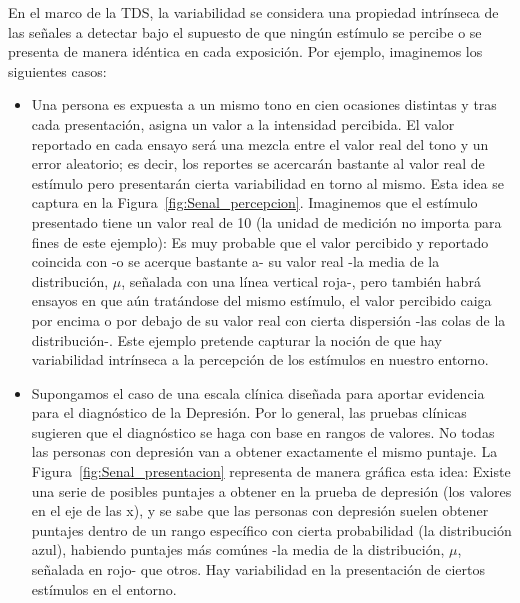 En el marco de la TDS, la variabilidad se considera una propiedad intrínseca de las señales a detectar bajo el supuesto de que ningún estímulo se percibe o se presenta de manera idéntica en cada exposición. Por ejemplo, imaginemos los siguientes casos: \\

\begin{itemize}

\item Una persona es expuesta a un mismo tono en cien ocasiones distintas y tras cada presentación, asigna un valor a la intensidad percibida. El valor reportado en cada ensayo será una mezcla entre el valor real del tono y un error aleatorio; es decir, los reportes se acercarán bastante al valor real de estímulo pero presentarán cierta variabilidad en torno al mismo. Esta idea se captura en la Figura~\ref{fig:Senal_percepcion}. Imaginemos que el estímulo presentado tiene un valor real de 10 (la unidad de medición no importa para fines de este ejemplo): Es muy probable que el valor percibido y reportado coincida con -o se acerque bastante a- su valor real -la media de la distribución, $\mu$, señalada con una línea vertical roja-, pero también habrá ensayos en que aún tratándose del mismo estímulo, el valor percibido caiga por encima o por debajo de su valor real con cierta dispersión -las colas de la distribución-. Este ejemplo pretende capturar la noción de que hay variabilidad intrínseca a la percepción de los estímulos en nuestro entorno.\\

\item Supongamos el caso de una escala clínica diseñada para aportar evidencia para el diagnóstico de la Depresión. Por lo general, las pruebas clínicas sugieren que el diagnóstico se haga con base en rangos de valores. No todas las personas con depresión van a obtener exactamente el mismo puntaje. La Figura~\ref{fig:Senal_presentacion} representa de manera gráfica esta idea: Existe una serie de posibles puntajes a obtener en la prueba de depresión (los valores en el eje de las x), y se sabe que las personas con depresión suelen obtener puntajes dentro de un rango específico con cierta probabilidad (la distribución azul), habiendo puntajes más comúnes -la media de la distribución, $\mu$, señalada en rojo- que otros. Hay variabilidad en la presentación de ciertos estímulos en el entorno.\\

\end{itemize}

